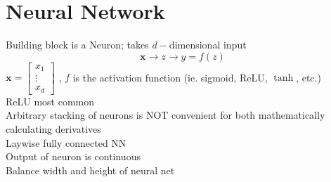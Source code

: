 \documentclass{article}
\begin{document}
\section{Neural Network}
Building block is a Neuron; takes $d-$dimensional input 
\[
    \mathbf x \to z \to y=f(z)
\]
$\mathbf x = \begin{bmatrix}
    x_1 \\ \vdots \\ x_d
\end{bmatrix}$
,
$f$ is the activation function (ie. sigmoid, ReLU, $\tanh$, etc.)
\\[5pt]
ReLU most common
\\[5pt]
Arbitrary stacking of neurons is NOT convenient for both mathematically calculating
derivatives 
\\[5pt]
Laywise fully connected NN
\\[5pt]
Output of neuron is continuous 
\\
Balance width and height of neural net
\end{document}

